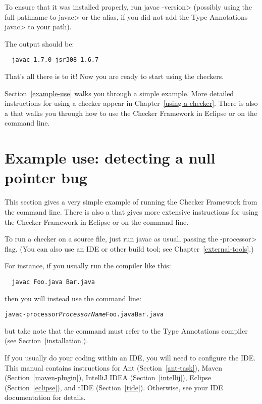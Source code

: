 To ensure that it was installed properly, run \<javac -version> (possibly using the
full pathname to \<javac> or the alias, if you did not add the Type Annotations \<javac> to your path).

The output should be:

\begin{Verbatim}
  javac 1.7.0-jsr308-1.6.7
\end{Verbatim}

That's all there is to it!  Now you are ready to start using the checkers.

Section~\ref{example-use} walks you through a simple example.  More detailed
instructions for using a checker appear in Chapter~\ref{using-a-checker}.
There is also a 
that walks you through how to use the Checker Framework in Eclipse or on
the command line.


\section{Example use:  detecting a null pointer bug\label{example-use}}

This section gives a very simple example of running the Checker Framework
from the command line.  There is also a 
that gives more extensive instructions for using the Checker Framework in
Eclipse or on the command line.


To run a checker on a source file, just run javac as usual, passing the
\<-processor> flag.  (You can also use an IDE or other build tool; see
Chapter~\ref{external-tools}.)

For instance, if you usually run the compiler like
this:

\begin{Verbatim}
  javac Foo.java Bar.java
\end{Verbatim}

\noindent
then you will instead use the command line:

\begin{alltt}
  javac -processor \textit{ProcessorName} Foo.java Bar.java
\end{alltt}

\noindent
but take note that the  command must refer to the Type
Annotations compiler (see Section~\ref{installation}).


If you usually do your coding within an IDE, you will need to configure
the IDE.  This manual contains instructions for
Ant (Section~\ref{ant-task}),
Maven (Section~\ref{maven-plugin}),
IntelliJ IDEA (Section~\ref{intellij}),
Eclipse (Section~\ref{eclipse}), and
tIDE (Section~\ref{tide}).
Otherwise, see your IDE documentation for details.


